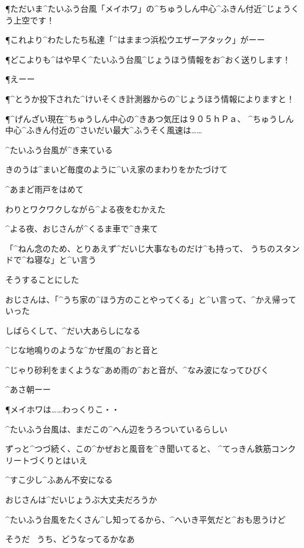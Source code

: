 \P ただいま^{たいふう}{台風}「メイホワ」の^{ちゅうしん}{中心}^{ふきん}{付近}^{じょうくう}{上空}です！

\P これより^{わたしたち}{私達}「^{はままつ}{浜松}ウエザーアタック」がーー

\P どこよりも^{はや}{早}く^{たいふう}{台風}^{じょうほう}{情報}をお^{おく}{送}りします！

\page
\P えーー

\P ^{とうか}{投下}された^{けいそくき}{計測器}からの^{じょうほう}{情報}によりますと！

\P ^{げんざい}{現在}^{ちゅうしん}{中心}の^{きあつ}{気圧}は９０５ｈＰａ、
^{ちゅうしん}{中心}^{ふきん}{付近}の^{さいだい}{最大}^{ふうそく}{風速}は……

\page
\A ^{たいふう}{台風}が^{き}{来}ている

\A きのうは^{まいど}{毎度}のように^{いえ}{家}のまわりをかたづけて

\A ^{あまど}{雨戸}をはめて

\A わりとワクワクしながら^{よる}{夜}をむかえた

\A ^{よる}{夜}、おじさんが^{くるま}{車}で^{き}{来}て

\A 「^{ねん}{念}のため、とりあえず^{だいじ}{大事}なものだけ^{も}{持}って、
うちのスタンドで^{ね}{寝}な」と^{い}{言}う

\A そうすることにした

\page
\A おじさんは、「^{うち}{家}の^{ほう}{方}のことやってくる」と^{い}{言}って、^{かえ}{帰}っていった

\A しばらくして、^{だい}{大}あらしになる

\A ^{じな}{地鳴}りのような^{かぜ}{風}の^{おと}{音}と

\A ^{じゃり}{砂利}をまくような^{あめ}{雨}の^{おと}{音}が、^{なみ}{波}になってひびく

\page
\A ^{あさ}{朝}ーー

\P メイホワは……わっくりこ・・

\page
\A ^{たいふう}{台風}は、まだこの^{へん}{辺}をうろついているらしい

\A ずっと^{つづ}{続}く、この^{かぜおと}{風音}を^{き}{聞}いてると、
^{てっきん}{鉄筋}コンクリートづくりとはいえ

\A ^{すこ}{少}し^{ふあん}{不安}になる

\A おじさんは^{だいじょうぶ}{大丈夫}だろうか

\A ^{たいふう}{台風}をたくさん^{し}{知}ってるから、^{へいき}{平気}だと^{おも}{思}うけど

\page
\A そうだ
\ うち、どうなってるかなあ

